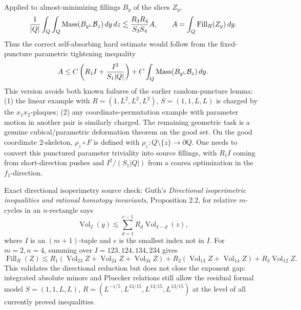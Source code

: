 \documentclass[12pt]{article}
\newcommand{\Vol}{\operatorname{Vol}}
\newcommand{\Fill}{\operatorname{Fill}}
\newcommand{\Mass}{\operatorname{Mass}}
\begin{document}
Applied to almost-minimizing fillings \(B_y\) of the slices \(Z_y\),
\[
 {1\over |Q|}\int_Q\int_Q\Mass(B_y\llcorner\mathcal B_z)\,dy\,dz
 \lesssim {R_3R_4\over S_3S_4} A,
 \qquad A=\int_Q\Fill_R(Z_y)\,dy.
\]
Thus the correct self-absorbing hard estimate would follow from the fixed-puncture
parametric tightening inequality
\[
 A\le C\left(R_1I+{I^2\over S_1|Q|}\right)
     +C\int_Q\Mass(B_y\llcorner\mathcal B_z)\,dy.
\]
This version avoids both known failures of the earlier random-puncture lemma:
(1) the linear example with \(R=(1,L^2,L^2,L^2)\), \(S=(1,1,L,L)\) is charged by
the \(x_1x_2\)-plaques; (2) any coordinate-permutation example with parameter
motion in another pair is similarly charged.  The remaining geometric task is a
genuine cubical/parametric deformation theorem on the good set.  On the good
coordinate \(2\)-skeleton, \(\rho_z\circ F\) is defined with
\(\rho_z:Q\setminus\{z\}\to\partial Q\).  One needs to convert this punctured
parameter triviality into source fillings, with \(R_1I\) coming from short-direction
pushes and \(I^2/(S_1|Q|)\) from a coarea optimization in the \(f_1\)-direction.

Exact directional isoperimetry source check: Guth's
\emph{Directional isoperimetric inequalities and rational homotopy invariants},
Proposition 2.2, for relative \(m\)-cycles in an \(n\)-rectangle says
\[
 \Vol_I(y)\lesssim \sum_{d=1}^{e-1} R_d\Vol_{I-d}(z),
\]
where \(I\) is an \((m+1)\)-tuple and \(e\) is the smallest index not in \(I\).
For \(m=2,n=4\), summing over \(I=123,124,134,234\) gives
\[
\Fill_R(Z)\lesssim
R_1(\Vol_{23}Z+\Vol_{24}Z+\Vol_{34}Z)
+R_2(\Vol_{13}Z+\Vol_{14}Z)+R_3\Vol_{12}Z.
\]
This validates the directional reduction but does not close the exponent gap:
integrated absolute minors and Pluecker relations still allow the residual
formal model \(S=(1,1,L,L)\),
\(R=(L^{-1/5},L^{13/15},L^{13/15},L^{13/15})\) at the level of all currently
proved inequalities.
\end{document}

